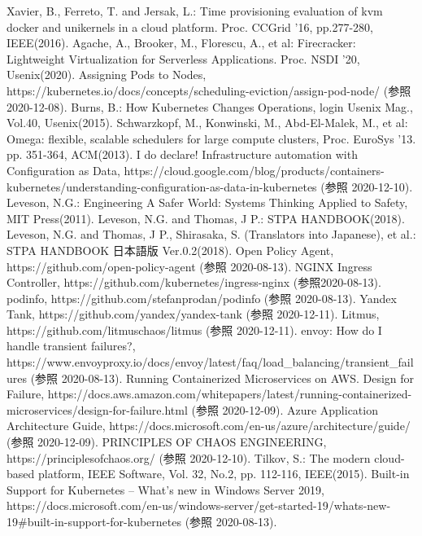 \documentclass[12pt,a4j]{ujreport}
\begin{document}
\begin{thebibliography}{99}
     Xavier, B., Ferreto, T. and Jersak, L.: Time provisioning evaluation of kvm docker and unikernels in a cloud platform. Proc. CCGrid ’16, pp.277-280, IEEE(2016).
     Agache, A., Brooker, M., Florescu, A., et al: Firecracker: Lightweight Virtualization for Serverless Applications. Proc. NSDI ’20, Usenix(2020).
     Assigning Pods to Nodes, https://kubernetes.io/docs/concepts/scheduling-eviction/assign-pod-node/ (参照 2020-12-08).
     Burns, B.: How Kubernetes Changes Operations, login Usenix Mag., Vol.40, Usenix(2015).
     Schwarzkopf, M., Konwinski, M., Abd-El-Malek, M., et al: Omega: flexible, scalable schedulers for large compute clusters, Proc. EuroSys '13. pp. 351-364, ACM(2013).
     I do declare! Infrastructure automation with Configuration as Data, https://cloud.google.com/blog/products/containers-kubernetes/understanding-configuration-as-data-in-kubernetes (参照 2020-12-10).
     Leveson, N.G.: Engineering A Safer World: Systems Thinking Applied to Safety, MIT Press(2011).
     Leveson, N.G. and Thomas, J P.: STPA HANDBOOK(2018).
     Leveson, N.G. and Thomas, J P., Shirasaka, S. (Translators into Japanese), et al.: STPA HANDBOOK 日本語版 Ver.0.2(2018).
     Open Policy Agent, https://github.com/open-policy-agent (参照 2020-08-13).
     NGINX Ingress Controller, https://github.com/kubernetes/ingress-nginx (参照2020-08-13).
     podinfo, https://github.com/stefanprodan/podinfo (参照 2020-08-13).
     Yandex Tank, https://github.com/yandex/yandex-tank (参照 2020-12-11).
     Litmus, https://github.com/litmuschaos/litmus (参照 2020-12-11).
     envoy: How do I handle transient failures?, https://www.envoyproxy.io/docs/envoy/latest/faq/load\_balancing/transient\_failures (参照 2020-08-13).
     Running Containerized Microservices on AWS. Design for Failure, https://docs.aws.amazon.com/whitepapers/latest/running-containerized-microservices/design-for-failure.html (参照 2020-12-09).
     Azure Application Architecture Guide, https://docs.microsoft.com/en-us/azure/architecture/guide/ (参照 2020-12-09).
     PRINCIPLES OF CHAOS ENGINEERING, https://principlesofchaos.org/ (参照 2020-12-10).
     Tilkov, S.: The modern cloud-based platform, IEEE Software, Vol. 32, No.2, pp. 112-116, IEEE(2015).
     Built-in Support for Kubernetes – What's new in Windows Server 2019, https://docs.microsoft.com/en-us/windows-server/get-started-19/whats-new-19\#built-in-support-for-kubernetes (参照 2020-08-13).

\end{thebibliography}
\end{document}
